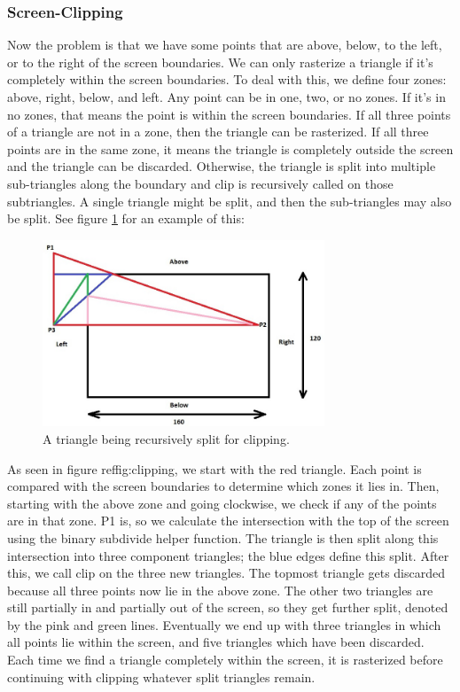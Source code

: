 \documentclass[onecolumn]{IEEEtran}
\begin{document}
\subsubsection{Screen-Clipping}
Now the problem is that we have some points that are above, below, to the left, or to the right of the screen boundaries.  We can only rasterize a triangle if it’s completely within the screen boundaries.  To deal with this, we define four zones: above, right, below, and left.  Any point can be in one, two, or no zones.  If it’s in no zones, that means the point is within the screen boundaries.  If all three points of a triangle are not in a zone, then the triangle can be rasterized.  If all three points are in the same zone, it means the triangle is completely outside the screen and the triangle can be discarded.  Otherwise, the triangle is split into multiple sub-triangles along the boundary and clip is recursively called on those subtriangles.  A single triangle might be split, and then the sub-triangles may also be split.  See figure \ref{fig:clipping} for an example of this:

\begin{figure}[H]
	\centering
	\includegraphics[width=0.75\textwidth]{clipping.png}
	\caption{A triangle being recursively split for clipping.}
	\label{fig:clipping}
\end{figure}

As seen in figure ref{fig:clipping}, we start with the red triangle.  Each point is compared with the screen boundaries to determine which zones it lies in.  Then, starting with the above zone and going clockwise, we check if any of the points are in that zone.  P1 is, so we calculate the intersection with the top of the screen using the binary subdivide helper function.  The triangle is then split along this intersection into three component triangles; the blue edges define this split.  After this, we call clip on the three new triangles.  The topmost triangle gets discarded because all three points now lie in the above zone.  The other two triangles are still partially in and partially out of the screen, so they get further split, denoted by the pink and green lines.  Eventually we end up with three triangles in which all points lie within the screen, and five triangles which have been discarded.  Each time we find a triangle completely within the screen, it is rasterized before continuing with clipping whatever split triangles remain.
\end{document}
